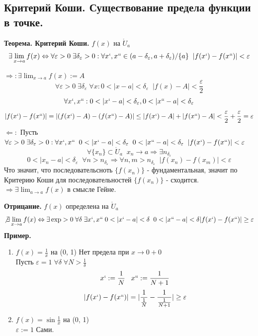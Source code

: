 \documentclass[12pt, a4paper]{article}
\newcommand{\eps}{\varepsilon}
\begin{document}
\subsection{Критерий Коши. Существование предела функции в точке.}
\textbf{Теорема. Критерий Коши.} $ f(x) $ на $\mathring U_a$
\[ \exists \lim_{x \to a} f(x) \Leftrightarrow \forall \eps > 0\; \exists \delta_\eps > 0: \forall x`, x`` \in (a - \delta_\eps, a + \delta_\eps)/\{a\}\;\; |f(x`) - f(x``)| < \eps \]
\begin{tcolorbox}[title=Доказательство]
	$\Rightarrow: \exists \lim_{x \to a} f(x) := A$
	\[ \forall \eps > 0\; \exists \delta_\eps\; \forall x: 0< |x - a| < \delta_\eps\;\; |f(x) - A| < \frac{\eps}{2} \]
	\[ \forall x`, x``: 0 < |x` - a| < \delta_\eps, 0 < |x`` - a| < \delta_\eps \]
	\[ |f(x`) - f(x``)| = |(f(x`) - A) - (f(x``) - A)| \leq |f(x`) - A| + |f(x``) - A| < \frac{\eps}{2} + \frac{\eps}{2} = \eps\]
	$\Leftarrow: $ Пусть $\forall \eps > 0\; \exists \delta_\eps > 0: \forall x`, x`` \;\; 0 < |x` - a| < \delta_\eps\;\; 0 < |x`` - a| < \delta_\eps \;\; |f(x`) - f(x``)| < \eps$\\
	\[ \forall \{ x_n \} \subset \mathring U_a\;\; x_n \to a \Rightarrow \exists n_{\delta_\eps} \]
	\[ 0 < |x_n - a| < \delta_\eps\;\; \forall n > n_{\delta_\eps} \Rightarrow \forall n, m > n_{\delta_\eps} \;\; |f(x_n) - f(x_m)| < \eps \]
	Что значит, что последовательсноть $\{ f(x_n) \}$ - фундаментальная, значит по Критерию Коши для последовательностей $\{f(x_n)\}$ - сходится. $\Rightarrow \exists \lim_{a\to a} f(x)$ в смысле Гейне.
\end{tcolorbox}

\textbf{Отрицание.} $f(x)$ определена на $ \mathring U_a$
\[ \not \exists \lim_{x \to a} f(x) \Leftrightarrow \exists \exp > 0\; \forall \delta\; \exists x`, x``\; 0 < |x` - a| < \delta \;\; 0 < |x`` - a| < \delta |f(x`) - f(x``)| \geq \eps \]
\textbf{Пример. } 
\begin{enumerate}
	\item $f(x) = \frac{1}{x}$ на (0, 1)
	Нет предела при $x \to 0 + 0$\\
	Пусть $\eps = 1\; \forall \delta\; \forall N > \frac{1}{\delta}$
	\[ x`:= \frac{1}{N}\;\;\; x`` := \frac{1}{N+1} \]
	\[ |f(x`) - f(x``)| = |\frac{1}{\frac{1}{N}} - \frac{1}{\frac{1}{N+1}}| \geq \eps \] 
	\item $f(x) = \sin \frac{1}{x}$ на (0, 1)\\
		$\eps := 1$ Сами. 

\end{enumerate}
\end{document}
